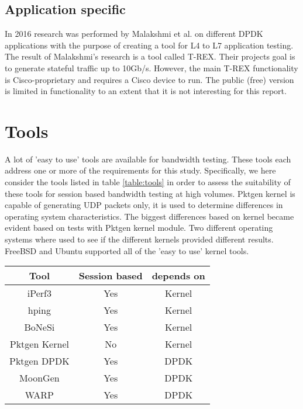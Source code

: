 \subsection{Application specific}
In 2016 research was performed by Malakshmi et al. \cite{mahalakshmi2016study} on different DPDK applications with the purpose of creating a tool for L4 to L7 application testing. 
The result of Malakshmi's research is a tool called T-REX. Their projects goal is to generate stateful traffic up to 10Gb/s. 
However, the main T-REX functionality is Cisco-proprietary and requires a Cisco device to run. The public (free) version is limited in functionality to an extent that it is not interesting for this report.
\section{Tools}\label{sec:tools}
A lot of 'easy to use' tools are available for bandwidth testing. These tools each address one or more of the requirements for this study.
Specifically, we here consider the tools listed in table \ref{table:tools} in order to assess the suitability of these tools for session based bandwidth testing at high volumes.
Pktgen kernel is capable of generating UDP packets only, it is used to determine differences in operating system characteristics. The biggest differences based on kernel became evident based on tests with Pktgen kernel module.
Two different operating systems where used to see if the different kernels provided different results. FreeBSD and Ubuntu supported all of the 'easy to use' kernel tools.

\begin{table*}[ht]
\centering
\begin{tabular}{|c|c|c|} \hline
\textbf{Tool} & \textbf{Session based} & \textbf{depends on} \\ \hline
iPerf3\cite{iperf} & Yes & Kernel  \\ \hline
hping\cite{hping}  & Yes & Kernel \\ \hline
BoNeSi\cite{bonesi} & Yes & Kernel \\ \hline
Pktgen Kernel\cite{pktgen-kernel} & No & Kernel \\ \hline
Pktgen DPDK\cite{pktgen-dpdk} & Yes & DPDK \\ \hline
MoonGen\cite{moongen} & Yes & DPDK \\ \hline
WARP\cite{warp} & Yes & DPDK \\ \hline
\end{tabular}
\caption{Tested tools}
\label{table:tools}
\end{table*} 

